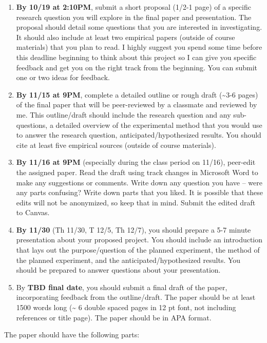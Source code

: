 \documentclass[
  letterpaper,
  DIV=11,
  numbers=noendperiod]{scrreprt}
\begin{document}
\begin{enumerate}
\def\labelenumi{\arabic{enumi}.}
\item
  \textbf{By 10/19 at 2:10PM}, submit a short proposal (1/2-1 page) of a
  specific research question you will explore in the final paper and
  presentation. The proposal should detail some questions that you are
  interested in investigating. It should also include at least two
  empirical papers (outside of course materials) that you plan to read.
  I highly suggest you spend some time before this deadline beginning to
  think about this project so I can give you specific feedback and get
  you on the right track from the beginning. You can submit one or two
  ideas for feedback.
\item
  \textbf{By 11/15 at 9PM}, complete a detailed outline or rough draft
  (\textasciitilde3-6 pages) of the final paper that will be
  peer-reviewed by a classmate and reviewed by me. This outline/draft
  should include the research question and any sub-questions, a detailed
  overview of the experimental method that you would use to answer the
  research question, anticipated/hypothesized results. You should cite
  at least five empirical sources (outside of course materials).
\item
  \textbf{By 11/16 at 9PM} (especially during the class period on
  11/16), peer-edit the assigned paper. Read the draft using track
  changes in Microsoft Word to make any suggestions or comments. Write
  down any question you have -- were any parts confusing? Write down
  parts that you liked. It is possible that these edits will not be
  anonymized, so keep that in mind. Submit the edited draft to Canvas.
\item
  \textbf{By 11/30} (Th 11/30, T 12/5, Th 12/7), you should prepare a
  5-7 minute presentation about your proposed project. You should
  include an introduction that lays out the purpose/question of the
  planned experiment, the method of the planned experiment, and the
  anticipated/hypothesized results. You should be prepared to answer
  questions about your presentation.
\item
  By \textbf{TBD final date}, you should submit a final draft of the
  paper, incorporating feedback from the outline/draft. The paper should
  be at least 1500 words long (\textasciitilde{} 6 double spaced pages
  in 12 pt font, not including references or title page). The paper
  should be in APA format.
\end{enumerate}

The paper should have the following parts:
\end{document}
